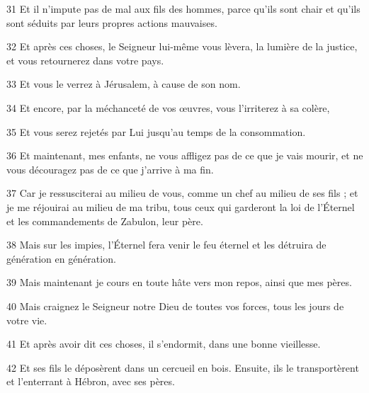 \par 31 Et il n'impute pas de mal aux fils des hommes, parce qu'ils sont chair et qu'ils sont séduits par leurs propres actions mauvaises.

\par 32 Et après ces choses, le Seigneur lui-même vous lèvera, la lumière de la justice, et vous retournerez dans votre pays.

\par 33 Et vous le verrez à Jérusalem, à cause de son nom.

\par 34 Et encore, par la méchanceté de vos œuvres, vous l'irriterez à sa colère,

\par 35 Et vous serez rejetés par Lui jusqu'au temps de la consommation.

\par 36 Et maintenant, mes enfants, ne vous affligez pas de ce que je vais mourir, et ne vous découragez pas de ce que j'arrive à ma fin.

\par 37 Car je ressusciterai au milieu de vous, comme un chef au milieu de ses fils ; et je me réjouirai au milieu de ma tribu, tous ceux qui garderont la loi de l'Éternel et les commandements de Zabulon, leur père.

\par 38 Mais sur les impies, l'Éternel fera venir le feu éternel et les détruira de génération en génération.

\par 39 Mais maintenant je cours en toute hâte vers mon repos, ainsi que mes pères.

\par 40 Mais craignez le Seigneur notre Dieu de toutes vos forces, tous les jours de votre vie.

\par 41 Et après avoir dit ces choses, il s'endormit, dans une bonne vieillesse.

\par 42 Et ses fils le déposèrent dans un cercueil en bois. Ensuite, ils le transportèrent et l'enterrant à Hébron, avec ses pères.



